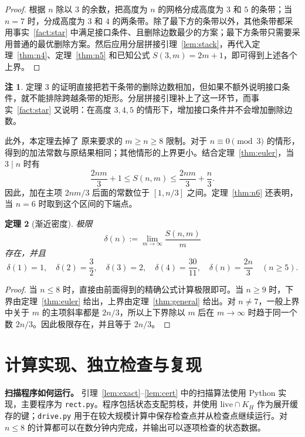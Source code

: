 \documentclass[11pt]{ctexart}
\newtheorem{theorem}{定理}[section]
\theoremstyle{definition}
\newtheorem{remark}[theorem]{注}
\begin{document}
\begin{proof}
根据 $n$ 除以 $3$ 的余数，把高度为 $n$ 的网格分成高度为 $3$ 和 $5$ 的条带；当 $n=7$ 时，分成高度为 $3$ 和 $4$ 的两条带。除了最下方的条带以外，其他条带都采用事实~\ref{fact:star} 中满足接口条件、且删除边数最少的方案；最下方条带只需要采用普通的最优删除方案。然后应用分层拼接引理~\ref{lem:stack}，再代入定理~\ref{thm:n4}、定理~\ref{thm:n5} 和已知公式 $S(3,m)=2m+1$，即可得到上述各个上界。
\end{proof}

\begin{remark}
\cite{NT25} 定理 3 的证明直接把若干条带的删除边数相加，但如果不额外说明接口条件，就不能排除跨越条带的矩形。分层拼接引理补上了这一环节，而事实~\ref{fact:star} 又说明：在高度 $3,4,5$ 的情形下，增加接口条件并不会增加删除边数。

此外，本定理去掉了 \cite{NT25} 原来要求的 $m\ge n\ge8$ 限制。对于 $n\equiv0\pmod3$ 的情形，得到的加法常数与原结果相同；其他情形的上界更小。结合定理~\ref{thm:euler}，当 $3\mid n$ 时有
\[
\frac{2nm}{3}+1\le S(n,m)\le\frac{2nm}{3}+\frac n3.
\]
因此，加在主项 $2nm/3$ 后面的常数位于 $[1,n/3]$ 之间。定理~\ref{thm:n6} 还表明，当 $n=6$ 时取到这个区间的下端点。
\end{remark}

\begin{theorem}[渐近密度]\label{thm:density}
极限
\[
\delta(n):=\lim_{m\to\infty}\frac{S(n,m)}m
\]
存在，并且
\[
\delta(1)=1,\quad
\delta(2)=\frac32,\quad
\delta(3)=2,\quad
\delta(4)=\frac{30}{11},\quad
\delta(n)=\frac{2n}{3}\quad(n\ge5).
\]
\end{theorem}

\begin{proof}
当 $n\le8$ 时，直接由前面得到的精确公式计算极限即可。当 $n\ge9$ 时，下界由定理~\ref{thm:euler} 给出，上界由定理~\ref{thm:general} 给出。对 $n\ne7$，一般上界中关于 $m$ 的主项斜率都是 $2n/3$，所以上下界除以 $m$ 后在 $m\to\infty$ 时趋于同一个数 $2n/3$。因此极限存在，并且等于 $2n/3$。
\end{proof}
\section{计算实现、独立检查与复现}\label{sec:comp}

\textbf{扫描程序如何运行。}
引理~\ref{lem:exact}--\ref{lem:cert} 中的扫描算法使用 Python 实现，主要程序为 \texttt{rect.py}。程序包括状态支配剪枝，并使用 $\mathrm{live}\cap K_H$ 作为展开缓存的键；\texttt{drive.py} 用于在较大规模计算中保存检查点并从检查点继续运行。对 $n\le8$ 的计算都可以在数分钟内完成，并输出可以逐项检查的状态数据。
\end{document}
